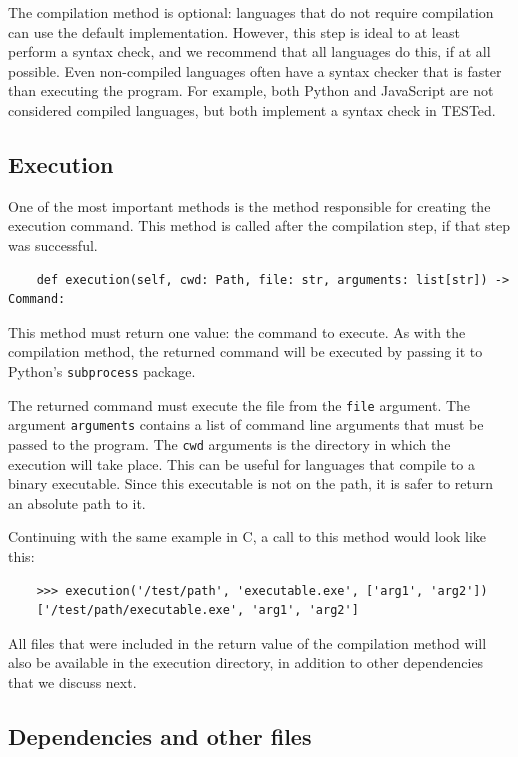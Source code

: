\documentclass[../main]{subfiles}
\begin{document}
The compilation method is optional: languages that do not require compilation can use the default implementation.
However, this step is ideal to at least perform a syntax check, and we recommend that all languages do this, if at all possible.
Even non-compiled languages often have a syntax checker that is faster than executing the program.
For example, both Python and JavaScript are not considered compiled languages, but both implement a syntax check in TESTed.

\subsection{Execution}\label{subsec:impl-execution}

One of the most important methods is the method responsible for creating the execution command.
This method is called after the compilation step, if that step was successful.

\begin{verbatim}
    def execution(self, cwd: Path, file: str, arguments: list[str]) -> Command:
\end{verbatim}

This method must return one value: the command to execute.
As with the compilation method, the returned command will be executed by passing it to Python's \texttt{subprocess} package.

The returned command must execute the file from the \texttt{file} argument.
The argument \texttt{arguments} contains a list of command line arguments that must be passed to the program.
The \texttt{cwd} arguments is the directory in which the execution will take place.
This can be useful for languages that compile to a binary executable.
Since this executable is not on the path, it is safer to return an absolute path to it.

Continuing with the same example in C, a call to this method would look like this:

\begin{verbatim}
    >>> execution('/test/path', 'executable.exe', ['arg1', 'arg2'])
    ['/test/path/executable.exe', 'arg1', 'arg2']
\end{verbatim}

All files that were included in the return value of the compilation method will also be available in the execution directory, in addition to other dependencies that we discuss next.

\subsection{Dependencies and other files}\label{subsec:dependencies-and-other-files}
\end{document}

